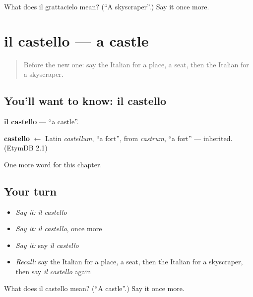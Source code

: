 \begin{tcolorbox}[breakable,colback=teal!4,colframe=teal!35!black,title={Before you move on}]
What does il grattacielo mean? (\textquotedblleft{}A skyscraper\textquotedblright{}.) Say it once more.
\end{tcolorbox}
\section[il castello]{il castello — a castle}

\label{lesson:IT-C228-castello}



\begin{quote}
Before the new one: say the Italian for a place, a seat, then the Italian for a skyscraper.
\end{quote}

\subsection*{You'll want to know: il castello}
\textbf{il castello} — \textquotedblleft{}a castle\textquotedblright{}.

\begin{cousinweb}
\textbf{castello} $\leftarrow$ Latin \emph{castellum}, \textquotedblleft{}a fort\textquotedblright{}, from \emph{castrum}, \textquotedblleft{}a fort\textquotedblright{} — inherited. (EtymDB 2.1)
\end{cousinweb}

\begin{grammarlens}[title={What you've built}]
One more word for this chapter.
\end{grammarlens}

\subsection*{Your turn}
\begin{itemize}
\raggedright
  \item \emph{Say it:} \emph{il castello}
  \item \emph{Say it:} \emph{il castello}, once more
  \item \emph{Say it:} say \emph{il castello}
  \item \emph{Recall:} say the Italian for a place, a seat, then the Italian for a skyscraper, then say \emph{il castello} again
\end{itemize}

\begin{tcolorbox}[breakable,colback=teal!4,colframe=teal!35!black,title={Before you move on}]
What does il castello mean? (\textquotedblleft{}A castle\textquotedblright{}.) Say it once more.
\end{tcolorbox}
